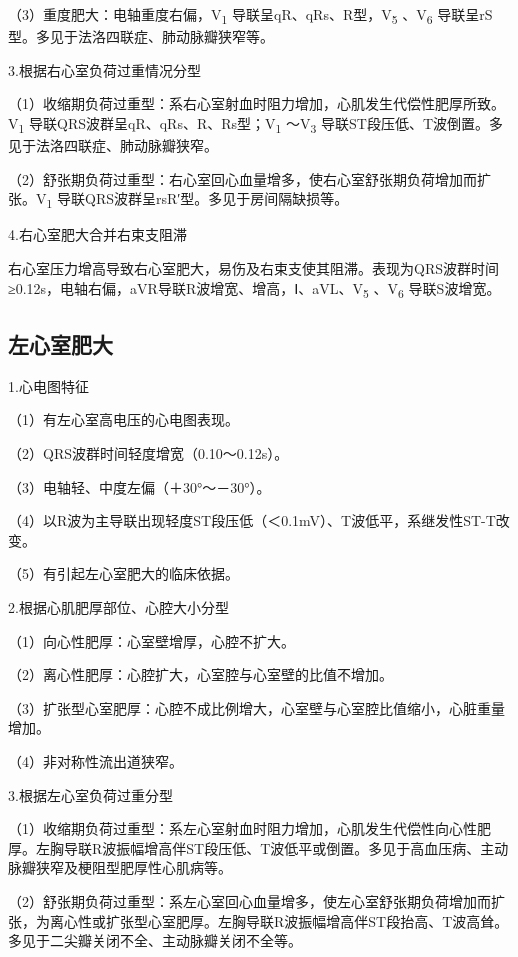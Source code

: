 （3）重度肥大：电轴重度右偏，V\textsubscript{1}
导联呈qR、qRs、R型，V\textsubscript{5} 、V\textsubscript{6}
导联呈rS型。多见于法洛四联症、肺动脉瓣狭窄等。

3.根据右心室负荷过重情况分型

（1）收缩期负荷过重型：系右心室射血时阻力增加，心肌发生代偿性肥厚所致。V\textsubscript{1}
导联QRS波群呈qR、qRs、R、Rs型；V\textsubscript{1} ～V\textsubscript{3}
导联ST段压低、T波倒置。多见于法洛四联症、肺动脉瓣狭窄。

（2）舒张期负荷过重型：右心室回心血量增多，使右心室舒张期负荷增加而扩张。V\textsubscript{1}
导联QRS波群呈rsR′型。多见于房间隔缺损等。

4.右心室肥大合并右束支阻滞

右心室压力增高导致右心室肥大，易伤及右束支使其阻滞。表现为QRS波群时间≥0.12s，电轴右偏，aVR导联R波增宽、增高，Ⅰ、aVL、V\textsubscript{5}
、V\textsubscript{6} 导联S波增宽。

\protect\hypertarget{text00009.htmlux5cux23subid42}{}{}

\subsection{左心室肥大}

1.心电图特征

（1）有左心室高电压的心电图表现。

（2）QRS波群时间轻度增宽（0.10～0.12s）。

（3）电轴轻、中度左偏（＋30°～－30°）。

（4）以R波为主导联出现轻度ST段压低（＜0.1mV）、T波低平，系继发性ST-T改变。

（5）有引起左心室肥大的临床依据。

2.根据心肌肥厚部位、心腔大小分型

（1）向心性肥厚：心室壁增厚，心腔不扩大。

（2）离心性肥厚：心腔扩大，心室腔与心室壁的比值不增加。

（3）扩张型心室肥厚：心腔不成比例增大，心室壁与心室腔比值缩小，心脏重量增加。

（4）非对称性流出道狭窄。

3.根据左心室负荷过重分型

（1）收缩期负荷过重型：系左心室射血时阻力增加，心肌发生代偿性向心性肥厚。左胸导联R波振幅增高伴ST段压低、T波低平或倒置。多见于高血压病、主动脉瓣狭窄及梗阻型肥厚性心肌病等。

（2）舒张期负荷过重型：系左心室回心血量增多，使左心室舒张期负荷增加而扩张，为离心性或扩张型心室肥厚。左胸导联R波振幅增高伴ST段抬高、T波高耸。多见于二尖瓣关闭不全、主动脉瓣关闭不全等。


